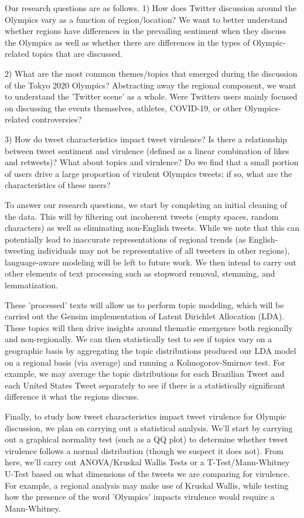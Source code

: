 \documentclass[letterpaper]{article} %
\begin{document}
Our research questions are as follows. 1) How does Twitter discussion around the Olympics vary as a function of region/location? We want to better understand whether regions have differences in the prevailing sentiment when they discuss the Olympics as well as whether there are differences in the types of Olympic-related topics that are discussed.

2) What are the most common themes/topics that emerged during the discussion of the Tokyo 2020 Olympics? Abstracting away the regional component, we want to understand the 'Twitter scene' as a whole. Were Twitters users mainly focused on discussing the events themselves, athletes, COVID-19, or other Olympics-related controversies?

3) How do tweet characteristics impact tweet virulence? Is there a relationship between tweet sentiment and virulence (defined as a linear combination of likes and retweets)? What about topics and virulence? Do we find that a small portion of users drive a large proportion of virulent Olympics tweets; if so, what are the characteristics of these users?

To answer our research questions, we start by completing an initial cleaning of the data. This will by filtering out incoherent tweets (empty spaces, random characters) as well as eliminating non-English tweets. While we note that this can potentially lead to inaccurate representations of regional trends (as English-tweeting individuals may not be representative of all tweeters in other regions), language-aware modeling will be left to future work. We then intend to carry out other elements of text processing such as stopword removal, stemming, and lemmatization. 

These 'processed' texts will allow us to perform topic modeling, which will be carried out the Gensim implementation of Latent Dirichlet Allocation (LDA). These topics will then drive insights around thematic emergence both regionally and non-regionally. We can then statistically test to see if topics vary on a geographic basis by aggregating the topic distributions produced our LDA model on a regional basis (via average) and running a Kolmogorov-Smirnov test. For example, we may average the topic distributions for each Brazilian Tweet and each United States Tweet separately to see if there is a statistically significant difference it what the regions discuss.

Finally, to study how tweet characteristics impact tweet virulence for Olympic discussion, we plan on carrying out a statistical analysis. We'll start by carrying out a graphical normality test (such as a QQ plot) to determine whether tweet virulence follows a normal distribution (though we suspect it does not). From here, we'll carry out ANOVA/Kruskal Wallis Tests or a T-Test/Mann-Whitney U-Test based on what dimensions of the tweets we are comparing for virulence. For example, a regional analysis may make use of Kruskal Wallis, while testing how the presence of the word 'Olympics' impacts virulence would require a Mann-Whitney. 
\end{document}
